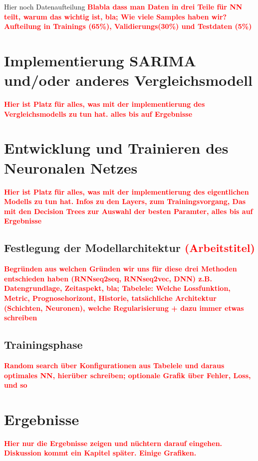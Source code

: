 \documentclass[
12pt, %
toc=listofnumbered, %
toc=chapterentrydotfill, %
numbers=noenddot, %
captions=tableheading, %
bibliography=numbered
]{scrreprt}
\let\Oldsection\section
\renewcommand{\section}{\FloatBarrier\Oldsection}
\let\Oldsubsection\subsection
\renewcommand{\subsection}{\FloatBarrier\Oldsubsection}
\newcommand{\highlight}[1]{\textbf{\textcolor{red}{#1}}}
\begin{document}
Hier noch Datenaufteilung
\highlight{Blabla dass man Daten in drei Teile für NN teilt, warum das wichtig ist, bla; 
Wie viele Samples haben wir? Aufteilung in Trainings (65\%), Validierungs(30\%) und Testdaten (5\%)}

\section{Implementierung SARIMA und/oder anderes Vergleichsmodell}
\highlight{Hier ist Platz für alles, was mit der implementierung des Vergleichsmodells zu tun hat. 
alles bis auf Ergebnisse}

\section{Entwicklung und Trainieren des Neuronalen Netzes}
\highlight{Hier ist Platz für alles, was mit der implementierung des eigentlichen Modells zu tun hat. 
Infos zu den Layers, zum Trainingsvorgang, Das mit den Decision Trees zur Auswahl der besten Paramter, 
alles bis auf Ergebnisse}

\subsection{Festlegung der Modellarchitektur \highlight{(Arbeitstitel)}}
\highlight{Begründen aus welchen Gründen wir uns für diese drei Methoden entschieden haben 
(RNNseq2seq, RNNseq2vec, DNN) z.B. Datengrundlage, Zeitaspekt, bla; 
Tabelele: Welche Lossfunktion, Metric, Prognosehorizont, Historie, tatsächliche Architektur (Schichten, Neuronen), 
welche Regularisierung + dazu immer etwas schreiben }

\subsection{Trainingsphase}
\highlight{Random search über Konfigurationen aus Tabelele und daraus optimales NN, hierüber schreiben; 
optionale Grafik über Fehler, Loss, und so}

\section{Ergebnisse}
\highlight{Hier nur die Ergebnisse zeigen und nüchtern darauf eingehen. Diskussion kommt ein Kapitel später. Einige Grafiken.}

\end{document}
